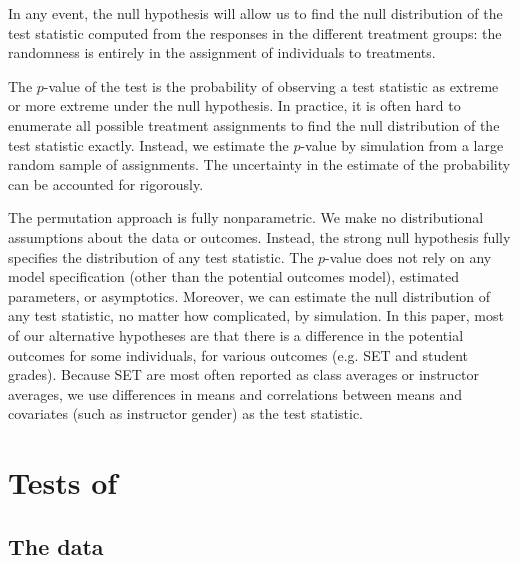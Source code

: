 \documentclass[12pt]{article}
\begin{document}
In any event, the null hypothesis will allow us to find the null distribution of the test statistic computed 
from the responses in the different treatment groups: 
the randomness is entirely in the assignment of individuals to treatments.

The $p$-value of the test is the probability of observing a test statistic as extreme or more extreme under the null hypothesis.  
In practice, it is often hard to enumerate all possible treatment assignments to find the
null distribution of the test statistic exactly.
Instead, we estimate the $p$-value by simulation from a large random sample of assignments.  
The uncertainty in the estimate of the probability can be accounted for rigorously.

The permutation approach is fully nonparametric.  
We make no distributional assumptions about the data or outcomes.  
Instead, the strong null hypothesis fully specifies the distribution of any test statistic.  
The $p$-value does not rely on any model specification (other than the potential outcomes model), 
estimated parameters, or asymptotics.  
Moreover, we can estimate the null distribution of any test statistic, no matter how complicated, by simulation.  
In this paper, most of our alternative hypotheses are that there is a difference in the potential outcomes for some individuals, for various outcomes (e.g. SET and student grades). 
Because SET are most often reported as class averages or instructor averages, 
we use differences in means and correlations between means and covariates (such as instructor
gender) as the test statistic. 

\section{Tests of \citet{Boring2015}}
\subsection{The data}
\end{document}
